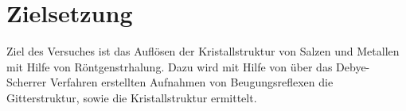 \section{Zielsetzung}
\label{sec:zielsetzung}
%
Ziel des Versuches  ist das Auflösen der Kristallstruktur von Salzen und Metallen mit Hilfe von Röntgenstrhalung. Dazu wird mit Hilfe von
über das Debye-Scherrer Verfahren erstellten Aufnahmen von Beugungsreflexen die Gitterstruktur, sowie die Kristallstruktur ermittelt.
